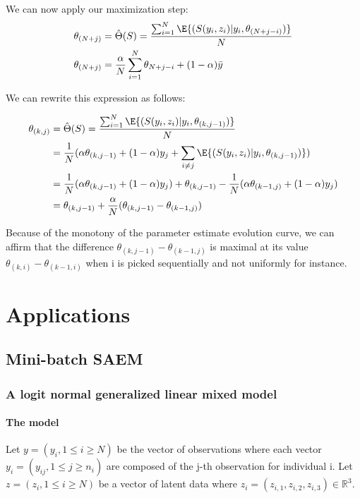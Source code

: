 \documentclass[a4paper]{article}
\theoremstyle{plain}
\theoremstyle{plain}
\theoremstyle{definition}
\begin{document}
\noindent We can now apply our maximization step:
\begin{equation}
\begin{split}
& \theta_{(N+j)} = \hat{\Theta}(S) = \frac{\sum_{i=1}^{N}{\E{(S(y_i,z_i)|y_i,\theta_{(N+j-i)})}}}{N}\\
& \theta_{(N+j)} = \frac{\alpha}{N} \sum_{i=1}^{N}{\theta_{N+j-i}} + (1-\alpha)\bar{y}\\
\end{split}
\end{equation}

We can rewrite this expression as follows:

\begin{equation}
\begin{split}
\theta_{(k,j)} &  = \hat{\Theta}(S) = \frac{\sum_{i=1}^{N}{\E{(S(y_i,z_i)|y_i,\theta_{(k,j-1)})}}}{N}\\
& = \frac{1}{N}(\alpha \theta_{(k,j-1)} + (1-\alpha)y_j + \sum_{i \neq j}^{}{\E{(S(y_i,z_i)|y_i,\theta_{(k,j-1)})}})\\
& = \frac{1}{N}(\alpha \theta_{(k,j-1)} + (1-\alpha)y_j) + \theta_{(k,j-1)} - \frac{1}{N}(\alpha \theta_{(k-1,j)} + (1-\alpha)y_j)\\
& =  \theta_{(k,j-1)} + \frac{\alpha}{N}(\theta_{(k,j-1)} - \theta_{(k-1,j)}) 
\end{split}
\end{equation}

Because of the monotony of the parameter estimate evolution curve, we can affirm that the difference $\theta_{(k,j-1)} - \theta_{(k-1,j)}$ is maximal at its value $\theta_{(k,i)} - \theta_{(k-1,i)}$ when i is picked sequentially and not uniformly for instance.\\

\newpage
\section{Applications}
\subsection{Mini-batch SAEM}
\subsubsection{A logit normal generalized linear mixed model}
\paragraph{The model}
Let $y = (y_i, 1 \leq i \geq N)$ be the vector of observations where each vector $y_i = (y_{ij}, 1 \leq j \geq n_i)$ are composed of the j-th observation for individual i. Let $z = (z_i, 1 \leq i \geq N)$ be a vector of latent data where $z_i=(z_{i,1},z_{i,2},z_{i,3}) \in \mathbb{R}^3$.\\
\end{document}
